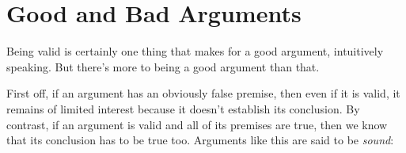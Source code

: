 %
%	
%


%



\section{Good and Bad Arguments}\label{s:GoodBadArg}

Being valid is certainly one thing that makes for a good argument, intuitively speaking.  But there's more to being a good argument than that.

First off, if an argument has an obviously false premise, then even if it is valid, it remains of limited interest because it doesn't establish its conclusion.  By contrast, if an argument is valid and all of its premises are true, then we know that its conclusion has to be true too.  Arguments like this are said to be \emph{sound}:


